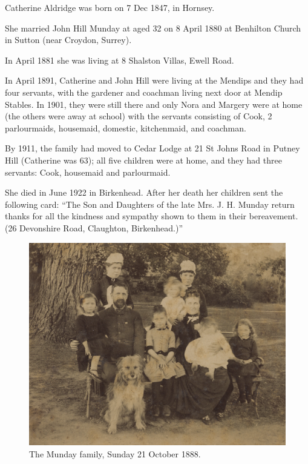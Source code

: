 
Catherine Aldridge was born on 7 Dec 1847, in Hornsey.\cite{JHMtree, 1881censusKingston}

She married John Hill Munday at aged 32 on 8 April 1880\cite{JHM-CA-marriage} at Benhilton Church in Sutton (near Croydon, Surrey).\cite{JHM-CA-marriage, JHM-CA-marriage-announcement}

In April 1881 she was living at 8 Shalston Villas, Ewell Road.\cite{1881censusKingston}

In April 1891, Catherine and John Hill were living at the Mendips and they had four servants, with the gardener and coachman living next door at Mendip Stables.\cite{1891census} In 1901, they were still there and only Nora and Margery were at home (the others were away at school) with the servants consisting of Cook, 2 parlourmaids, housemaid, domestic, kitchenmaid, and coachman.\cite{1901censusMendips}

By 1911, the family had moved to Cedar Lodge at 21 St Johns Road in Putney Hill (Catherine was 63); all five children were at home, and they had three servants: Cook, housemaid and parlourmaid.\cite{1911censusWandsworth}

She died in June 1922 in Birkenhead.\cite{FreeBMD-CA} After her death her children sent the following card: ``The Son and Daughters of the late Mrs. J. H. Munday return thanks for all the kindness and sympathy shown to them in their bereavement. (26 Devonshire Road, Claughton, Birkenhead.)''\cite{CA-bereavement-card}

\begin{figure}
	\centering
	\includegraphics{photos/JH_Munday_and_family_1888.png}
	\caption{The Munday family, Sunday 21 October 1888.}
\end{figure}

